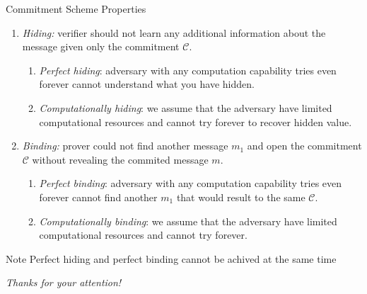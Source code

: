 \documentclass[xcolor={usenames,dvipsnames}]{beamer}
\begin{document}
    \begin{frame}{Commitment Scheme Properties}
        \begin{definition}
            \begin{enumerate}
                \item \textit{Hiding: } verifier should not learn any additional information about the message given only the commitment $\mathcal{C}$.
                \begin{enumerate}
                    \item \textit{Perfect hiding}: adversary with any computation capability tries even forever cannot understand what you have hidden.
                    \item \textit{Computationally hiding}: we assume that the adversary have limited computational resources and cannot try forever to recover hidden value.
                \end{enumerate}
                
                \item \textit{Binding: } prover could not find another message $m_1$ and open the commitment $\mathcal{C}$ without revealing the commited message $m$.
                \begin{enumerate}
                    \item \textit{Perfect binding}: adversary with any computation capability tries even forever cannot find another $m_1$ that would result to the same $\mathcal{C}$.
                    \item \textit{Computationally binding}: we assume that the adversary have limited computational resources and cannot try forever.
                \end{enumerate}
            \end{enumerate}
        \end{definition}
        \begin{alertblock}{Note}
            Perfect hiding and perfect binding cannot be achived at the same time
        \end{alertblock}    
    \end{frame}

    
	\begin{frame}{}
      \centering \Large
      \emph{Thanks for your attention!}
    \end{frame}
\end{document}

